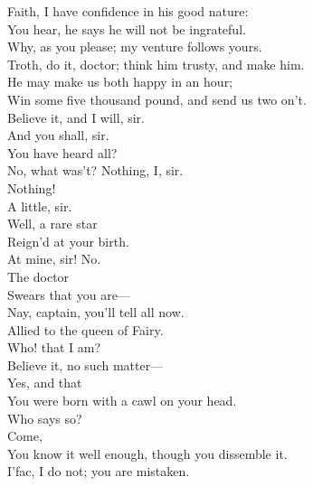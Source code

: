 \documentclass[a4paper,oneside]{memoir}
\begin{document}
\begin{drama*}
\facespeaks Faith, I have confidence in his good nature:\\
You hear, he says he will not be ingrateful.\\
\subtlespeaks Why, as you please; my venture follows yours.\\
\facespeaks Troth, do it, doctor; think him trusty, and make him.\\
He may make us both happy in an hour;\\
Win some five thousand pound, and send us two on't.\\
\dapperspeaks Believe it, and I will, sir.\\
\facespeaks {} And you shall, sir.\\
You have heard all?\\
\dapperspeaks {} No, what was't? Nothing, I, sir.\\
\facespeaks Nothing!\\
\dapperspeaks {} A little, sir.\\
\facespeaks {} Well, a rare star\\
Reign'd at your birth.\\
\dapperspeaks {} At mine, sir! No.\\
\facespeaks {} The doctor\\
Swears that you are---\\
\subtlespeaks {} Nay, captain, you'll tell all now.\\
\facespeaks Allied to the queen of Fairy.\\
\dapperspeaks {} Who! that I am?\\
Believe it, no such matter---\\
\facespeaks {} Yes, and that\\
You were born with a cawl on your head.\\
\dapperspeaks {} Who says so?\\
\facespeaks {} Come,\\
You know it well enough, though you dissemble it.\\
\dapperspeaks I'fac, I do not; you are mistaken.\\

\end{drama*}
\end{document}
